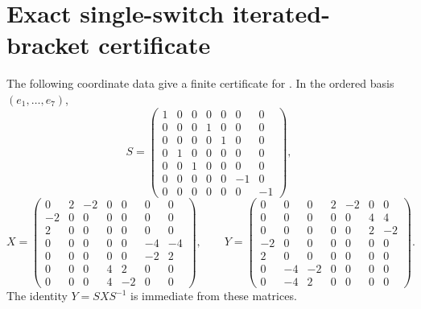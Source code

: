 \documentclass[11pt,a4paper]{article}
\begin{document}
\appendix
\section{Exact single-switch iterated-bracket certificate}
\label{app:single-brackets}

The following coordinate data give a finite certificate for .  In the ordered basis $(e_1,\ldots,e_7)$,
\[
S=\begin{pmatrix}
1&0&0&0&0&0&0\\
0&0&0&1&0&0&0\\
0&0&0&0&1&0&0\\
0&1&0&0&0&0&0\\
0&0&1&0&0&0&0\\
0&0&0&0&0&-1&0\\
0&0&0&0&0&0&-1
\end{pmatrix},
\]
\[
X=\begin{pmatrix}
0&2&-2&0&0&0&0\\
-2&0&0&0&0&0&0\\
2&0&0&0&0&0&0\\
0&0&0&0&0&-4&-4\\
0&0&0&0&0&-2&2\\
0&0&0&4&2&0&0\\
0&0&0&4&-2&0&0
\end{pmatrix},\qquad
Y=\begin{pmatrix}
0&0&0&2&-2&0&0\\
0&0&0&0&0&4&4\\
0&0&0&0&0&2&-2\\
-2&0&0&0&0&0&0\\
2&0&0&0&0&0&0\\
0&-4&-2&0&0&0&0\\
0&-4&2&0&0&0&0
\end{pmatrix}.
\]
The identity $Y=SXS^{-1}$ is immediate from these matrices.
\end{document}
